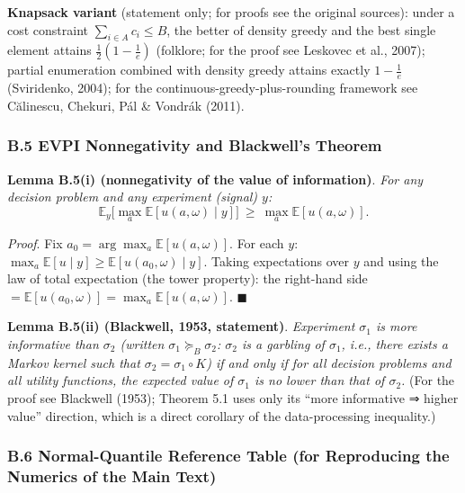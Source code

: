 \documentclass[
  11pt]{article}
\begin{document}
\textbf{Knapsack variant} (statement only; for proofs see the original
sources): under a cost constraint \(\sum_{i\in A} c_i \le B\), the
better of density greedy and the best single element attains
\(\frac12(1-\frac1e)\) (folklore; for the proof see Leskovec et al.,
2007); partial enumeration combined with density greedy attains exactly
\(1-\frac1e\) (Sviridenko, 2004); for the
continuous-greedy-plus-rounding framework see Călinescu, Chekuri, Pál \&
Vondrák (2011).

\subsubsection{B.5 EVPI Nonnegativity and Blackwell's
Theorem}\label{b.5-evpi-nonnegativity-and-blackwells-theorem}

\textbf{Lemma B.5(i) (nonnegativity of the value of information)}.
\emph{For any decision problem and any experiment (signal) \(y\):}
\[\mathbb{E}_y\Big[\max_a \mathbb{E}[u(a,\omega)\mid y]\Big] \ \ge\ \max_a \mathbb{E}[u(a,\omega)].\]

\emph{Proof}. Fix \(a_0 = \arg\max_a \mathbb{E}[u(a,\omega)]\). For each
\(y\):
\(\max_a \mathbb{E}[u\mid y] \ge \mathbb{E}[u(a_0,\omega)\mid y]\).
Taking expectations over \(y\) and using the law of total expectation
(the tower property): the right-hand side
\(= \mathbb{E}[u(a_0,\omega)] = \max_a \mathbb{E}[u(a,\omega)]\).
\(\blacksquare\)

\textbf{Lemma B.5(ii) (Blackwell, 1953, statement)}. \emph{Experiment
\(\sigma_1\) is more informative than \(\sigma_2\) (written
\(\sigma_1 \succeq_B \sigma_2\): \(\sigma_2\) is a garbling of
\(\sigma_1\), i.e., there exists a Markov kernel such that
\(\sigma_2 = \sigma_1 \circ K\)) if and only if for all decision
problems and all utility functions, the expected value of \(\sigma_1\)
is no lower than that of \(\sigma_2\).} (For the proof see Blackwell
(1953); Theorem 5.1 uses only its ``more informative ⇒ higher value''
direction, which is a direct corollary of the data-processing
inequality.)

\subsubsection{B.6 Normal-Quantile Reference Table (for Reproducing the
Numerics of the Main
Text)}\label{b.6-normal-quantile-reference-table-for-reproducing-the-numerics-of-the-main-text}
\end{document}
